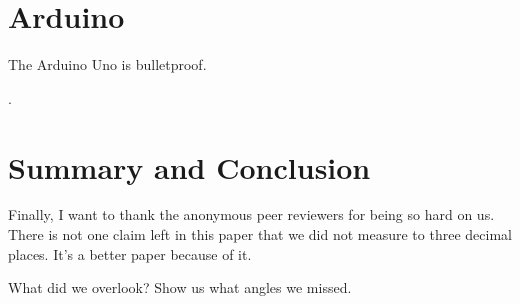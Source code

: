 \documentclass[letterpaper]{article}
\begin{document}
\section{Arduino}
The Arduino Uno is bulletproof.

\cite{Guri2024c}.

\section{Summary and Conclusion}
Finally, I want to thank the anonymous peer reviewers for being so hard on us.
There is not one claim left in this paper that we did not measure to three
decimal places. It's a better paper because of it.

What did we overlook? Show us what angles we missed.


\end{document}

